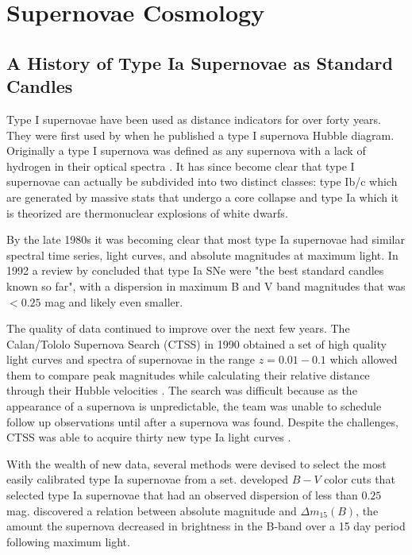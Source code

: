 \section{Supernovae Cosmology}
\subsection{A History of Type Ia Supernovae as Standard Candles}
Type I supernovae have been used as distance indicators for over forty years. They were first used by \cite{kowal68a} when he published a type I supernova Hubble diagram. Originally a type I supernova was defined as any supernova with a lack of hydrogen in their optical spectra \citep{minkowski41a}. It has since become clear that type I supernovae can actually be subdivided into two distinct classes: type Ib/c which are generated by massive stats that undergo a core collapse and type Ia which it is theorized are thermonuclear explosions of white dwarfs. 

By the late 1980s it was becoming clear that most type Ia supernovae had similar spectral time series, light curves, and absolute magnitudes at maximum light. In 1992 a review by \citeauthor*{branch92a} concluded that type Ia SNe were "the best standard candles known so far", with a dispersion in maximum B and V band magnitudes that was $< 0.25$ mag and likely even smaller. 

The quality of data continued to improve over the next few years. The Calan/Tololo Supernova Search (CTSS) in 1990 obtained a set of high quality light curves and spectra of supernovae in the range $z = 0.01 - 0.1$ which allowed them to compare peak magnitudes while calculating their relative distance through their Hubble velocities \citep{hamuy93a}. The search was difficult because as the appearance of a supernova is unpredictable, the team was unable to schedule follow up observations until after a supernova was found. Despite the challenges, CTSS was able to acquire thirty new type Ia light curves \citep{hamuy05a}.

With the wealth of new data, several methods were devised to select the most easily calibrated type Ia supernovae from a set. \citet{vaughan95a} developed $B-V$ color cuts that selected type Ia supernovae that had an observed dispersion of less than $0.25$ mag. \citet{phillips93a} discovered a relation between absolute magnitude and $\Delta m_{15} (B)$, the amount the supernova decreased in brightness in the B-band over a 15 day period following maximum light.

